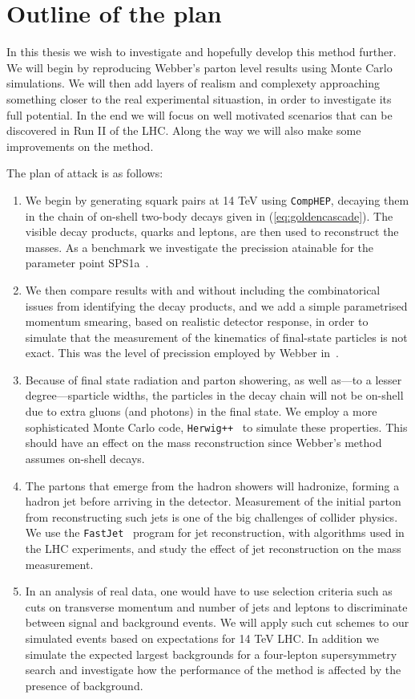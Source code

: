 \documentclass[twoside,english]{uiofysmaster}
\begin{document}
\section{Outline of the plan}
In this thesis we wish to investigate and hopefully develop this method further. We will begin by reproducing Webber's parton level results using Monte Carlo simulations. We will then add layers of realism and complexety approaching something closer to the real experimental situastion, in order to investigate its full potential. In the end we will focus on well motivated scenarios that can be discovered in Run II of the LHC.  Along the way we will also make some improvements on the method.

The plan of attack is as follows:
\begin{enumerate}
	\item We begin by generating squark pairs at 14 TeV using {\tt CompHEP}, decaying them in the chain of on-shell two-body decays given in (\ref{eq:goldencascade}). The visible decay products, quarks and leptons, are then used to reconstruct the masses. As a benchmark we investigate the precission atainable for the parameter point SPS1a~\cite{Allanach:2002nj}. 
	\item	We then compare results with and without including the combinatorical issues from identifying the decay products, and we add a simple parametrised momentum smearing, based on realistic detector response, in order to simulate that the measurement of the kinematics of final-state particles is not exact. This was the level of precission employed by Webber in~\cite{Webber:2009vm}.
	\item Because of final state radiation and parton showering, as well as---to a lesser degree---sparticle widths, the particles in the decay chain will not be on-shell due to extra gluons (and photons) in the final state. We employ a more sophisticated Monte Carlo code, {\tt Herwig++}~\cite{Bahr:2008pv}  to simulate these properties. This should have an effect on the mass reconstruction since Webber's method assumes on-shell decays.
	\item The partons that emerge from the hadron showers will hadronize, forming a hadron jet before arriving in the detector. Measurement of the initial parton from reconstructing such jets is one of the big challenges of collider physics. We use the {\tt FastJet}~\cite{Cacciari:2011ma} program for jet reconstruction, with algorithms used in the LHC experiments, and study the effect of jet reconstruction on the mass measurement.
	\item In an analysis of real data, one would have to use selection criteria such as cuts on transverse momentum and number of jets and leptons to discriminate between signal and background events. We will apply such cut schemes to our simulated events based on expectations for 14 TeV LHC. In addition we simulate the expected largest backgrounds for a four-lepton supersymmetry search and investigate how the performance of the method is affected by the presence of background.

\end{enumerate}
\end{document}
